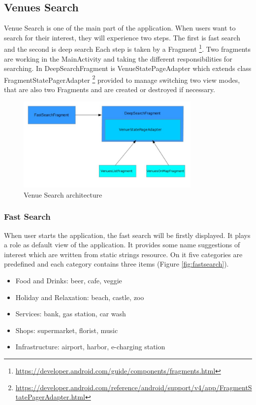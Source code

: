 \subsection{Venues Search}
Venue Search is one of the main part of the application. When users want to search for their interest, they will experience two steps. The first is fast search and the second is deep search
Each step is taken by a Fragment \footnote{\url{https://developer.android.com/guide/components/fragments.html}}. Two fragments are working in the MainActivity and taking the different responsibilities for searching. In DeepSearchFragment is VenueStatePageAdapter which extends class FragmentStatePagerAdapter  \footnote{\url{https://developer.android.com/reference/android/support/v4/app/FragmentStatePagerAdapter.html}} provided  to manage switching two view modes, that are also two Fragments and are created or destroyed if necessary.
\begin{figure}[htbp]
	\includegraphics[width=0.8\textwidth]{images/venue_search.jpg}
	\centering
	\caption[]{Venue Search architecture}
	\label{fig:venue_search}
\end{figure}
\subsubsection{Fast Search}
When user starts the application, the fast search will be firstly displayed. It plays a role as default view of the application. It provides some name suggestions of interest which are written from static strings resource. On it five categories are predefined and each category contains three items (Figure \ref{fig:fastsearch}).
\begin{itemize}
	 \item Food and Drinks: beer, cafe, veggie
	 \item Holiday and Relaxation: beach, castle, zoo
	 \item Services: bank, gas station, car wash
	 \item Shops: supermarket, florist, music
	 \item Infrastructure: airport, harbor, e-charging station
\end{itemize}


